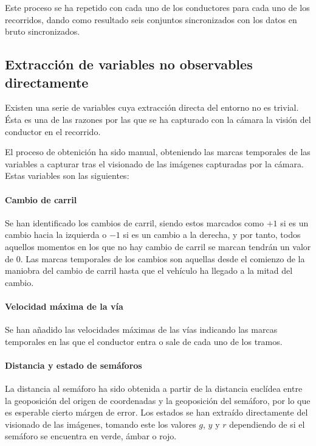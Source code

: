 Este proceso se ha repetido con cada uno de los conductores para cada uno de los recorridos, dando como resultado seis conjuntos sincronizados con los datos en bruto sincronizados.

\subsection{Extracción de variables no observables directamente}

Existen una serie de variables cuya extracción directa del entorno no es trivial. Ésta es una de las razones por las que se ha capturado con la cámara la visión del conductor en el recorrido.

El proceso de obtenición ha sido manual, obteniendo las marcas temporales de las variables a capturar tras el visionado de las imágenes capturadas por la cámara. Estas variables son las siguientes:

\paragraph{Cambio de carril}

Se han identificado los cambios de carril, siendo estos marcados como $+1$ si es un cambio hacia la izquierda o $-1$ si es un cambio a la derecha, y por tanto, todos aquellos momentos en los que no hay cambio de carril se marcan tendrán un valor de $0$. Las marcas temporales de los cambios son aquellas desde el comienzo de la maniobra del cambio de carril hasta que el vehículo ha llegado a la mitad del cambio.

\paragraph{Velocidad máxima de la vía}

Se han añadido las velocidades máximas de las vías indicando las marcas temporales en las que el conductor entra o sale de cada uno de los tramos.

\paragraph{Distancia y estado de semáforos}

La distancia al semáforo ha sido obtenida a partir de la distancia euclídea entre la geoposición del origen de coordenadas y la geoposición del semáforo, por lo que es esperable cierto márgen de error. Los estados se han extraído directamente del visionado de las imágenes, tomando este los valores $g$, $y$ y $r$ dependiendo de si el semáforo se encuentra en verde, ámbar o rojo.


